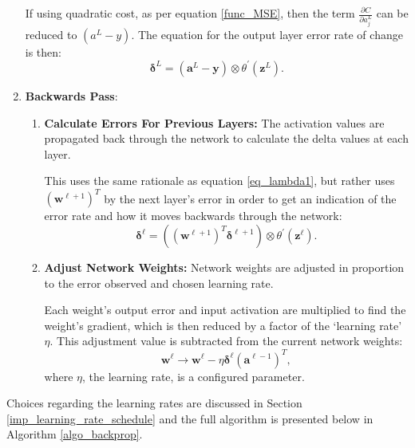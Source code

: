 \documentclass[a4paper,11pt,oneside]{article}
\theoremstyle{plain}
\theoremstyle{definition}
\begin{document}
\begin{enumerate}
		If using quadratic cost, as per equation \eqref{func_MSE}, then the term $\frac{\partial C}{\partial a_{j}^{L}}$ can be reduced to $(a^L - y)$. The equation for the output layer error rate of change is then:
		\begin{equation}\label{eq_lambda3}
		\mathbf{\delta}^L = (\mathbf{a}^L - \mathbf{y}) \otimes \theta^{\prime}(\mathbf{z}^L) .
		\end{equation}
		\newline		
		\item \textbf{Backwards Pass}: 
		\begin{enumerate}
			\item \textbf{Calculate Errors For Previous Layers:} The activation values are propagated back through the network to calculate the delta values at each layer. \newline
			
			This uses the same rationale as equation \eqref{eq_lambda1}, but rather uses $(\mathbf{w}^{\ell+1})^T$ by the next layer's error in order to get an indication of the error rate and how it moves backwards through the network:
			\begin{equation}\label{eq_lambda4}
			\mathbf{\delta}^\ell = ((\mathbf{w}^{\ell+1})^T\mathbf{\delta}^{\ell+1})  \otimes \theta^{\prime}(\mathbf{z}^\ell) .
			\end{equation}
			
			\item \textbf{Adjust Network Weights:} Network weights are adjusted in proportion to the error observed and chosen learning rate.\newline
			
			Each weight's output error and input activation are multiplied to find the weight's gradient, which is then reduced by a factor of the ‘learning rate’ $\eta$. This adjustment value is subtracted from the current network weights:
			\begin{equation}\label{eq_bp_weightupdate}
			\mathbf{w}^\ell \rightarrow \mathbf{w}^\ell - {\eta}\mathbf{\delta}^{\ell} (\mathbf{a}^{\ell - 1})^T ,
			\end{equation}
			where $\eta$, the learning rate, is a configured parameter.
		\end{enumerate}
		
	\end{enumerate}
	
	Choices regarding the learning rates are discussed in Section \ref{imp_learning_rate_schedule} and the full algorithm is presented below in Algorithm \ref{algo_backprop}.\newline
	
\end{document}
